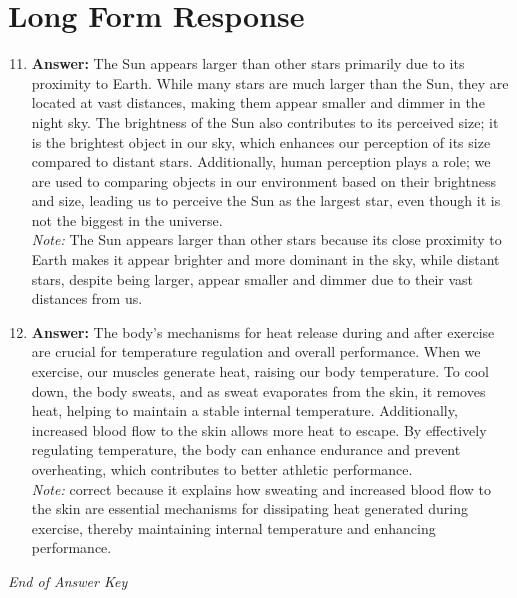 \documentclass[12pt]{article}
\begin{document}
\section*{Long Form Response}
\begin{enumerate}[label=\arabic*.]
\setcounter{enumi}{10}
\item \textbf{Answer:} The Sun appears larger than other stars primarily due to its proximity to Earth. While many stars are much larger than the Sun, they are located at vast distances, making them appear smaller and dimmer in the night sky. The brightness of the Sun also contributes to its perceived size; it is the brightest object in our sky, which enhances our perception of its size compared to distant stars. Additionally, human perception plays a role; we are used to comparing objects in our environment based on their brightness and size, leading us to perceive the Sun as the largest star, even though it is not the biggest in the universe.
\\ \textit{Note:} The Sun appears larger than other stars because its close proximity to Earth makes it appear brighter and more dominant in the sky, while distant stars, despite being larger, appear smaller and dimmer due to their vast distances from us.
\item \textbf{Answer:} The body's mechanisms for heat release during and after exercise are crucial for temperature regulation and overall performance. When we exercise, our muscles generate heat, raising our body temperature. To cool down, the body sweats, and as sweat evaporates from the skin, it removes heat, helping to maintain a stable internal temperature. Additionally, increased blood flow to the skin allows more heat to escape. By effectively regulating temperature, the body can enhance endurance and prevent overheating, which contributes to better athletic performance.
\\ \textit{Note:} correct because it explains how sweating and increased blood flow to the skin are essential mechanisms for dissipating heat generated during exercise, thereby maintaining internal temperature and enhancing performance.
\end{enumerate}

\vfill
\noindent\textit{End of Answer Key}
\end{document}
